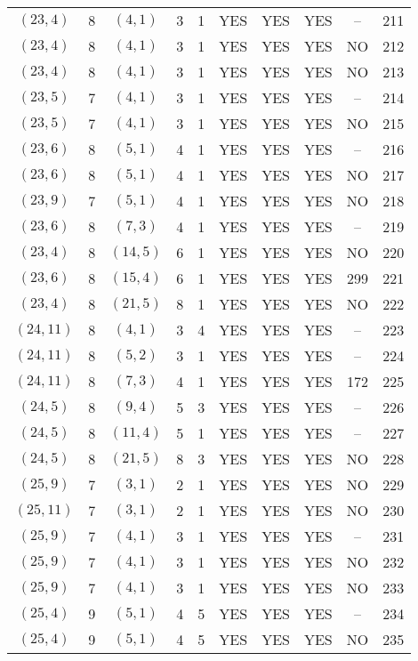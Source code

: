 \begin{longtable}{|c|c|c|c|c|c|c|c|c|c|}
$(23, 4)$ & 8 & $(4, 1)$ & 3 & 1 & YES & YES & YES & -- & 211\\
$(23, 4)$ & 8 & $(4, 1)$ & 3 & 1 & YES & YES & YES & NO & 212\\
$(23, 4)$ & 8 & $(4, 1)$ & 3 & 1 & YES & YES & YES & NO & 213\\
$(23, 5)$ & 7 & $(4, 1)$ & 3 & 1 & YES & YES & YES & -- & 214\\
$(23, 5)$ & 7 & $(4, 1)$ & 3 & 1 & YES & YES & YES & NO & 215\\
$(23, 6)$ & 8 & $(5, 1)$ & 4 & 1 & YES & YES & YES & -- & 216\\
$(23, 6)$ & 8 & $(5, 1)$ & 4 & 1 & YES & YES & YES & NO & 217\\
$(23, 9)$ & 7 & $(5, 1)$ & 4 & 1 & YES & YES & YES & NO & 218\\
$(23, 6)$ & 8 & $(7, 3)$ & 4 & 1 & YES & YES & YES & -- & 219\\
$(23, 4)$ & 8 & $(14, 5)$ & 6 & 1 & YES & YES & YES & NO & 220\\
$(23, 6)$ & 8 & $(15, 4)$ & 6 & 1 & YES & YES & YES & 299 & 221\\
$(23, 4)$ & 8 & $(21, 5)$ & 8 & 1 & YES & YES & YES & NO & 222\\
$(24, 11)$ & 8 & $(4, 1)$ & 3 & 4 & YES & YES & YES & -- & 223\\
$(24, 11)$ & 8 & $(5, 2)$ & 3 & 1 & YES & YES & YES & -- & 224\\
$(24, 11)$ & 8 & $(7, 3)$ & 4 & 1 & YES & YES & YES & 172 & 225\\
$(24, 5)$ & 8 & $(9, 4)$ & 5 & 3 & YES & YES & YES & -- & 226\\
$(24, 5)$ & 8 & $(11, 4)$ & 5 & 1 & YES & YES & YES & -- & 227\\
$(24, 5)$ & 8 & $(21, 5)$ & 8 & 3 & YES & YES & YES & NO & 228\\
$(25, 9)$ & 7 & $(3, 1)$ & 2 & 1 & YES & YES & YES & NO & 229\\
$(25, 11)$ & 7 & $(3, 1)$ & 2 & 1 & YES & YES & YES & NO & 230\\
$(25, 9)$ & 7 & $(4, 1)$ & 3 & 1 & YES & YES & YES & -- & 231\\
$(25, 9)$ & 7 & $(4, 1)$ & 3 & 1 & YES & YES & YES & NO & 232\\
$(25, 9)$ & 7 & $(4, 1)$ & 3 & 1 & YES & YES & YES & NO & 233\\
$(25, 4)$ & 9 & $(5, 1)$ & 4 & 5 & YES & YES & YES & -- & 234\\
$(25, 4)$ & 9 & $(5, 1)$ & 4 & 5 & YES & YES & YES & NO & 235\\

\end{longtable}
